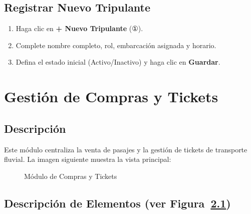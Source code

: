 \documentclass[12pt,a4paper]{report}
\begin{document}
\section{Registrar Nuevo Tripulante}

\begin{enumerate}
  \item Haga clic en \textbf{+ Nuevo Tripulante} (①).
  \item Complete nombre completo, rol, embarcación asignada y horario.
  \item Defina el estado inicial (Activo/Inactivo) y haga clic en \textbf{Guardar}.
\end{enumerate}

\chapter{Gestión de Compras y Tickets}

\section{Descripción}

Este módulo centraliza la venta de pasajes y la gestión de tickets de transporte fluvial. La imagen siguiente muestra la vista principal:

\begin{figure}[H]
  \centering
  \fbox{\rule{0pt}{4cm}\hspace{10cm}}
  \caption{Módulo de Compras y Tickets}
  \label{fig:compras}
\end{figure}

\section{Descripción de Elementos (ver Figura~\ref{fig:compras})}
\end{document}
